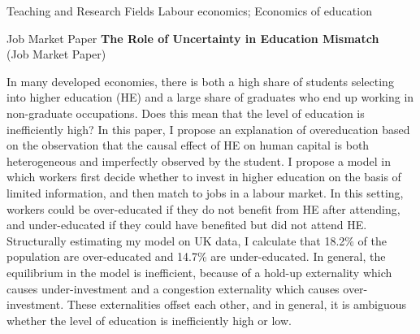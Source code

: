 \documentclass{resume} %
\begin{document}
\begin{rSection}{Teaching and Research Fields}
Labour economics; Economics of education
\end{rSection}

\begin{rSection}{Job Market Paper}
{\bf The Role of Uncertainty in Education Mismatch} \\ (Job Market Paper)

In many developed economies, there is both a high share of students selecting into higher education (HE) and a large share of graduates who end up working in non-graduate occupations. Does this mean that the level of education is inefficiently high? In this paper, I propose an explanation of overeducation based on the observation that the causal effect of HE on human capital is both heterogeneous and imperfectly observed by the student. I propose a model in which workers first decide whether to invest in higher education on the basis of limited information, and then match to jobs in a labour market. In this setting, workers could be over-educated if they do not benefit from HE after attending, and under-educated if they could have benefited but did not attend HE. Structurally estimating my model on UK data, I calculate that 18.2\% of the population are over-educated and 14.7\% are under-educated. In general, the equilibrium in the model is inefficient, because of a hold-up externality which causes under-investment and a congestion externality which causes over-investment. These externalities offset each other, and in general, it is ambiguous whether the level of education is inefficiently high or low. 
\end{rSection}
\end{document}
